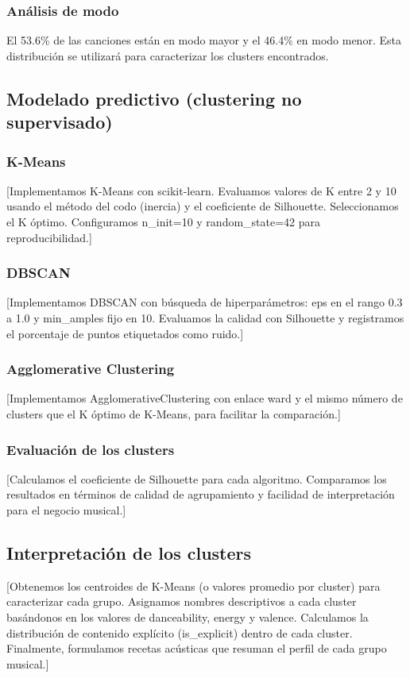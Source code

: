 \subsubsection{Análisis de modo}

El 53.6\% de las canciones están en modo mayor y el 46.4\% en modo menor. Esta distribución se utilizará para caracterizar los clusters encontrados.

\subsection{Modelado predictivo (clustering no supervisado)}

\subsubsection{K-Means}

[Implementamos K-Means con scikit-learn. Evaluamos valores de K entre 2 y 10 usando el método del codo (inercia) y el coeficiente de Silhouette. Seleccionamos el K óptimo. Configuramos n\_init=10 y random\_state=42 para reproducibilidad.]

\subsubsection{DBSCAN}

[Implementamos DBSCAN con búsqueda de hiperparámetros: eps en el rango 0.3 a 1.0 y min\_amples fijo en 10. Evaluamos la calidad con Silhouette y registramos el porcentaje de puntos etiquetados como ruido.]

\subsubsection{Agglomerative Clustering}

[Implementamos AgglomerativeClustering con enlace ward y el mismo número de clusters que el K óptimo de K-Means, para facilitar la comparación.]

\subsubsection{Evaluación de los clusters}

[Calculamos el coeficiente de Silhouette para cada algoritmo. Comparamos los resultados en términos de calidad de agrupamiento y facilidad de interpretación para el negocio musical.]

\subsection{Interpretación de los clusters}

[Obtenemos los centroides de K-Means (o valores promedio por cluster) para caracterizar cada grupo. Asignamos nombres descriptivos a cada cluster basándonos en los valores de danceability, energy y valence. Calculamos la distribución de contenido explícito (is\_explicit) dentro de cada cluster. Finalmente, formulamos recetas acústicas que resuman el perfil de cada grupo musical.]